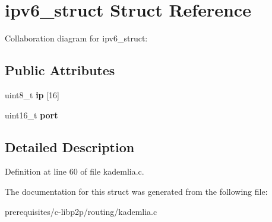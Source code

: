 \hypertarget{structipv6__struct}{}\section{ipv6\+\_\+struct Struct Reference}
\label{structipv6__struct}


Collaboration diagram for ipv6\+\_\+struct\+:
\subsection*{Public Attributes}
\begin{DoxyCompactItemize}
\item 
\mbox{\label{structipv6__struct_a98dc1d4c66ba877c384ee6cd14d56a4f}} 
uint8\+\_\+t {\bfseries ip} \mbox{[}16\mbox{]}
\item 
\mbox{\label{structipv6__struct_af523a44d1e8f5deb67980c5657c1ff9f}} 
uint16\+\_\+t {\bfseries port}
\end{DoxyCompactItemize}


\subsection{Detailed Description}


Definition at line 60 of file kademlia.\+c.



The documentation for this struct was generated from the following file\+:\begin{DoxyCompactItemize}
\item 
prerequisites/c-\/libp2p/routing/kademlia.\+c\end{DoxyCompactItemize}
